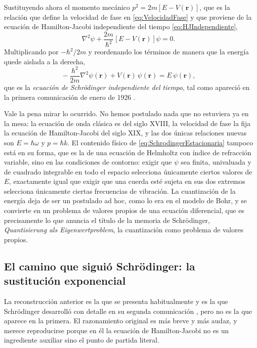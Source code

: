         Sustituyendo ahora el momento mecánico $p^{2} = 2m\left[E - V(\mathbf{r})\right]$, que es la relación que define la velocidad de fase en \eqref{eq:VelocidadFase} y que proviene de la ecuación de Hamilton-Jacobi independiente del tiempo \eqref{eq:HJIndependiente},
        \begin{equation}\label{eq:SchrodingerPaso1}
            \nabla^{2}\psi + \frac{2m}{\hbar^{2}}\left[E - V(\mathbf{r})\right]\psi = 0 .
        \end{equation}
        Multiplicando por $-\hbar^{2}/2m$ y reordenando los términos de manera que la energía quede aislada a la derecha,
        \begin{equation}\label{eq:SchrodingerEstacionaria}
            \boxed{\;-\frac{\hbar^{2}}{2m}\nabla^{2}\psi(\mathbf{r}) + V(\mathbf{r})\,\psi(\mathbf{r}) = E\,\psi(\mathbf{r}),\;}
        \end{equation}
        que es la \textit{ecuación de Schrödinger independiente del tiempo}, tal como apareció en la primera comunicación de enero de 1926 \citep{schrodinger1926quantisierung}.

        Vale la pena mirar lo ocurrido. No hemos postulado nada que no estuviera ya en la mesa: la ecuación de onda clásica es del siglo XVIII, la velocidad de fase la fija la ecuación de Hamilton-Jacobi del siglo XIX, y las dos únicas relaciones nuevas son $E = \hbar\omega$ y $p = \hbar k$. El contenido físico de \eqref{eq:SchrodingerEstacionaria} tampoco está en su forma, que es la de una ecuación de Helmholtz con índice de refracción variable, sino en las condiciones de contorno: exigir que $\psi$ sea finita, univaluada y de cuadrado integrable en todo el espacio selecciona únicamente ciertos valores de $E$, exactamente igual que exigir que una cuerda esté sujeta en sus dos extremos selecciona únicamente ciertas frecuencias de vibración. La cuantización de la energía deja de ser un postulado ad hoc, como lo era en el modelo de Bohr, y se convierte en un problema de valores propios de una ecuación diferencial, que es precisamente lo que anuncia el título de la memoria de Schrödinger, \textit{Quantisierung als Eigenwertproblem}, la cuantización como problema de valores propios.

    \subsection{El camino que siguió Schrödinger: la sustitución exponencial}

        La reconstrucción anterior es la que se presenta habitualmente y es la que Schrödinger desarrolló con detalle en su segunda comunicación \citep{schrodinger1926quantisierungII}, pero no es la que aparece en la primera. El razonamiento original es más breve y más audaz, y merece reproducirse porque en él la ecuación de Hamilton-Jacobi no es un ingrediente auxiliar sino el punto de partida literal.

